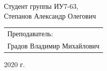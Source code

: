 \begin{titlepage}
\begin{center}
        Студент группы ИУ7-63,\\
        Степанов Александр Олегович
        \vfill
    \end{center}

    \begin{flushright}
        \large
        \begin{tabular}{l}
            Преподаватель: \\
            Градов Владимир Михайлович \\
        \end{tabular}
    \end{flushright}

   \begin{center}
        2020 г.
    \end{center}

\end{titlepage}

\tableofcontents
